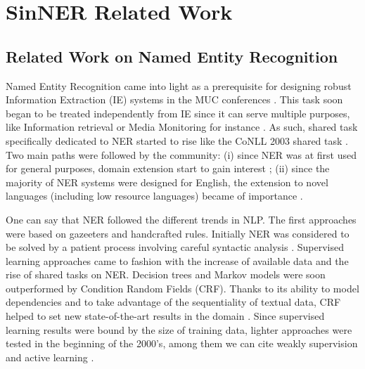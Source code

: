 \section{SinNER Related Work}

\subsection{Related Work on Named Entity Recognition}
\label{sec:sota}

Named Entity Recognition came into light as a prerequisite for designing robust Information Extraction (IE) systems in the MUC conferences \cite{grishman-sundheim-1995-design}. This task soon began to be treated independently from IE since it can serve multiple purposes, like Information retrieval or Media Monitoring for instance \cite{yangarber-etal-2002-unsupervised}. As such, shared task specifically dedicated to NER started to rise like the CoNLL 2003 shared task \cite{tjong-kim-sang-de-meulder-2003-introduction}. Two main paths were followed by the community: (i) since NER was at first used for general purposes, domain extension start to gain interest \cite{evans-2003-a}; (ii) since the majority of NER systems were designed for English, the extension to novel languages (including low resource languages) became of importance \cite{rossler-2004-adapting}.

One can say that NER followed the different trends in NLP. The first approaches were based on gazeeters and handcrafted rules. Initially NER was considered to be solved by a patient process involving careful syntactic analysis \cite{hobbs-1993-generic}. Supervised learning approaches came to fashion with the increase of available data and the rise of shared tasks on NER. Decision trees and Markov models were soon outperformed by Condition Random Fields (CRF).
Thanks to its ability to model dependencies and to take advantage of the sequentiality of textual data, CRF helped to set new state-of-the-art results in the domain \cite{finkel-etal-2005-incorporating}.
Since supervised learning results were bound by the size of training data, lighter approaches were tested in the beginning of the 2000's, among them we can cite weakly supervision \cite{yangarber-2003-counter} and active learning \cite{shen-etal-2004-multi}.

